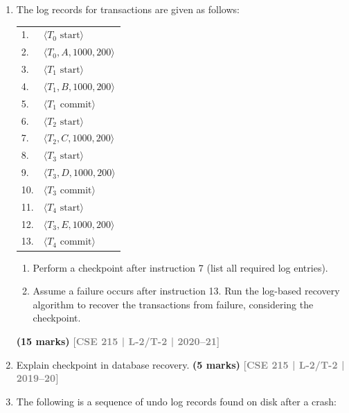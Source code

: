 \documentclass[12pt]{article}
\newcommand{\yr}[1]{\hfill\textcolor{gray}{\small\textbf{[#1]}}}
\newcommand{\mk}[1]{\textcolor{orange!70!black}{\small\textbf{(#1 marks)}}}
\begin{document}
\begin{enumerate}
\item The log records for transactions are given as follows:
\begin{center}
\small\ttfamily
\begin{tabular}{ll}
1. & $\langle T_0 \text{ start} \rangle$\\
2. & $\langle T_0, A, 1000, 200 \rangle$\\
3. & $\langle T_1 \text{ start} \rangle$\\
4. & $\langle T_1, B, 1000, 200 \rangle$\\
5. & $\langle T_1 \text{ commit} \rangle$\\
6. & $\langle T_2 \text{ start} \rangle$\\
7. & $\langle T_2, C, 1000, 200 \rangle$\\
8. & $\langle T_3 \text{ start} \rangle$\\
9. & $\langle T_3, D, 1000, 200 \rangle$\\
10. & $\langle T_3 \text{ commit} \rangle$\\
11. & $\langle T_4 \text{ start} \rangle$\\
12. & $\langle T_3, E, 1000, 200 \rangle$\\
13. & $\langle T_4 \text{ commit} \rangle$\\
\end{tabular}
\end{center}
\begin{enumerate}
  \item Perform a checkpoint after instruction 7 (list all required log entries).
  \item Assume a failure occurs after instruction 13. Run the log-based recovery algorithm to recover the transactions from failure, considering the checkpoint.
\end{enumerate}
\mk{15} \yr{CSE 215 | L-2/T-2 | 2020--21}


\item Explain checkpoint in database recovery.
\mk{5} \yr{CSE 215 | L-2/T-2 | 2019--20}


\item The following is a sequence of undo log records found on disk after a crash:


\end{enumerate}
\end{document}
